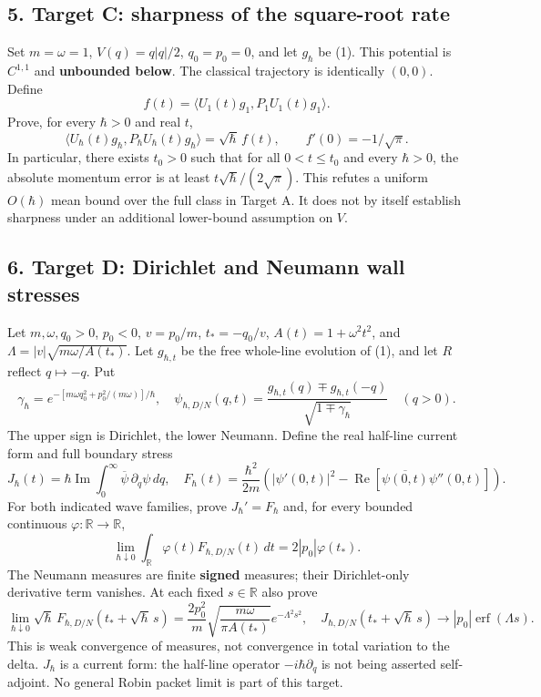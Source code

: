 \documentclass[11pt,a4paper]{article}
\begin{document}
\hypertarget{target-c-sharpness-of-the-square-root-rate}{%
\subsection{5. Target C: sharpness of the square-root
rate}\label{target-c-sharpness-of-the-square-root-rate}}

Set \(m=\omega=1\), \(V(q)=q|q|/2\), \(q_0=p_0=0\), and let \(g_\hbar\)
be (1). This potential is \(C^{1,1}\) and \textbf{unbounded below}. The
classical trajectory is identically \((0,0)\). Define
\[f(t)=\langle U_1(t)g_1,P_1U_1(t)g_1\rangle.\] Prove, for every
\(\hbar>0\) and real \(t\), \[
 \langle U_\hbar(t)g_\hbar,P_\hbar U_\hbar(t)g_\hbar\rangle
    =\sqrt\hbar\,f(t),\qquad f'(0)=-1/\sqrt\pi. \tag{C1}
\] In particular, there exists \(t_0>0\) such that for all
\(0<t\le t_0\) and every \(\hbar>0\), the absolute momentum error is at
least \(t\sqrt\hbar/(2\sqrt\pi)\). This refutes a uniform \(O(\hbar)\)
mean bound over the full class in Target A. It does not by itself
establish sharpness under an additional lower-bound assumption on \(V\).

\hypertarget{target-d-dirichlet-and-neumann-wall-stresses}{%
\subsection{6. Target D: Dirichlet and Neumann wall
stresses}\label{target-d-dirichlet-and-neumann-wall-stresses}}

Let \(m,\omega,q_0>0\), \(p_0<0\), \(v=p_0/m\), \(t_*=-q_0/v\),
\(A(t)=1+\omega^2t^2\), and \(\Lambda=|v|\sqrt{m\omega/A(t_*)}\). Let
\(g_{\hbar,t}\) be the free whole-line evolution of (1), and let \(R\)
reflect \(q\mapsto-q\). Put \[
 \gamma_\hbar=e^{-[m\omega q_0^2+p_0^2/(m\omega)]/\hbar},\quad
 \psi_{\hbar,D/N}(q,t)=
 \frac{g_{\hbar,t}(q)\mp g_{\hbar,t}(-q)}
      {\sqrt{1\mp\gamma_\hbar}}\quad(q>0). \tag{D0}
\] The upper sign is Dirichlet, the lower Neumann. Define the real
half-line current form and full boundary stress \[
 J_\hbar(t)=\hbar\operatorname{Im}\!\int_0^\infty
                 \overline\psi\,\partial_q\psi\,dq,\quad
 F_\hbar(t)=\frac{\hbar^2}{2m}
  \left(|\psi'(0,t)|^2-
        \operatorname{Re}[\overline{\psi(0,t)}\psi''(0,t)]\right).
 \tag{D1}
\] For both indicated wave families, prove \(J_\hbar'=F_\hbar\) and, for
every bounded continuous \(\varphi:\mathbb R\to\mathbb R\), \[
 \lim_{\hbar\downarrow0}\int_{\mathbb R}\varphi(t)F_{\hbar,D/N}(t)\,dt
    =2|p_0|\varphi(t_*). \tag{D2}
\] The Neumann measures are finite \textbf{signed} measures; their
Dirichlet-only derivative term vanishes. At each fixed \(s\in\mathbb R\)
also prove \[
 \lim_{\hbar\downarrow0}\sqrt\hbar\,
 F_{\hbar,D/N}(t_*+\sqrt\hbar\,s)
 =\frac{2p_0^2}{m}\sqrt{\frac{m\omega}{\pi A(t_*)}}
   e^{-\Lambda^2s^2},\quad
 J_{\hbar,D/N}(t_*+\sqrt\hbar\,s)\to
 |p_0|\operatorname{erf}(\Lambda s). \tag{D3}
\] This is weak convergence of measures, not convergence in total
variation to the delta. \(J_\hbar\) is a current form: the half-line
operator \(-i\hbar\partial_q\) is not being asserted self-adjoint. No
general Robin packet limit is part of this target.
\end{document}
